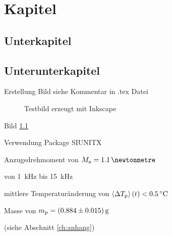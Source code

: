 \chapter{Kapitel}

\section{Unterkapitel}

\section{Unterunterkapitel}
Erstellung Bild siehe Kommentar in .tex Datei

\begin{figure}[h]
	\def\svgscale{0.98}
		 
		\caption{\label{fig:testbild}Testbild erzeugt mit Inkscape}
\end{figure}

Bild \ref{fig:testbild} \cite{Dannemann.Kucher_et.al_AppliedSciences_2018}  

Verwendung Package SIUNITX %

Anzugsdrehmoment von $M_{\textnormal{a}}=\SI{1.1}{\newtonmetre}$

von \SI{1}{\kilo\hertz} bis \SI{15}{\kilo\hertz}

mittlere Temperaturänderung von $\left\langle \Delta T_{\textnormal{p}}\right\rangle(t)<\SI{0.5}{\degreeCelsius}$

Masse von $m_{\textnormal{p}}=\SI[separate-uncertainty]{0.884 (15)}{\gram}$

(siehe Abschnitt \ref{ch:anhang})